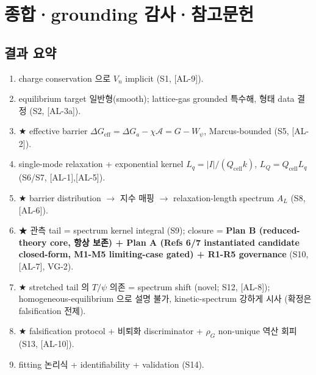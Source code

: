 \documentclass[11pt,a4paper]{article}
\newcommand{\eff}{\mathrm{eff}}
\newcommand{\cell}{\mathrm{cell}}
\newcommand{\AL}[1]{\textsf{[AL-#1]}}
\begin{document}
\section{종합·grounding 감사·참고문헌}\label{sec:summary}
\subsection{결과 요약}
\begin{enumerate}[label=\textbf{(R\arabic*)}]
\item charge conservation 으로 $V_n$ implicit (S1, \AL{9}).
\item equilibrium target 일반형(smooth); lattice-gas grounded 특수해, 형태 data 결정 (S2, \AL{3a}).
\item ★ effective barrier $\Delta G_\eff=\Delta G_a-\chi\mathcal A=G-W_\psi$, Marcus-bounded (S5, \AL{2}).
\item single-mode relaxation + exponential kernel $L_q=|I|/(Q_\cell k)$, $L_Q=Q_\cell L_q$ (S6/S7, \AL{1},\AL{5}).
\item ★ barrier distribution $\to$ 지수 매핑 $\to$ relaxation-length spectrum $A_L$ (S8, \AL{6}).
\item ★ 관측 tail = spectrum kernel integral (S9); closure = \textbf{Plan B (reduced-theory
  core, 항상 보존) + Plan A (Refs 6/7 instantiated candidate closed-form, M1-M5 limiting-case
  gated) + R1-R5 governance} (S10, \AL{7}, VG-2).
\item ★ stretched tail 의 $T/\psi$ 의존 = spectrum shift (novel; S12, \AL{8}); homogeneous-equilibrium 으로 설명 불가, kinetic-spectrum 강하게 시사 (확정은 falsification 전제).
\item ★ falsification protocol + 비퇴화 discriminator + $\rho_G$ non-unique 역산 회피 (S13, \AL{10}).
\item fitting 논리식 + identifiability + validation (S14).
\end{enumerate}
\end{document}
